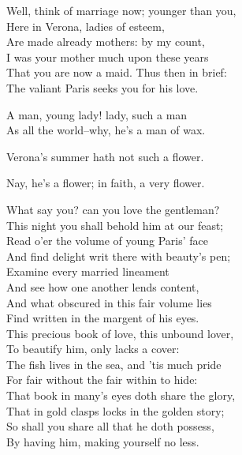 \begin{speech}
Well, think of marriage now; younger than you,
\\
Here in Verona, ladies of esteem, \\
Are made already mothers: by my count, \\
I was your mother much upon these years \\
That you are now a maid.   Thus then in brief: \\
The valiant Paris seeks you for his love. \\
\end{speech}
\begin{speech}
A man, young lady! lady, such a man \\
As all the world--why, he's a man of wax. \\
\end{speech}
\begin{speech}
Verona's summer hath not such a flower. \\
\end{speech}
\begin{speech}
Nay, he's a flower; in faith, a very flower. \\

\end{speech}
\begin{speech}
What say you? can you love the gentleman? \\
This night you shall behold him at our feast; \\
Read o'er the volume of young Paris' face \\
And find delight writ there with beauty's pen; \\
Examine every married lineament \\
And see how one another lends content, \\
And what obscured in this fair volume lies \\
Find written in the margent of his eyes. \\
This precious book of love, this unbound lover, \\
To beautify him, only lacks a cover: \\
The fish lives in the sea, and 'tis much pride \\
For fair without the fair within to hide: \\
That book in many's eyes doth share the glory, \\
That in gold clasps locks in the golden story; \\
So shall you share all that he doth possess, \\
By having him, making yourself no less. \\
\end{speech}
